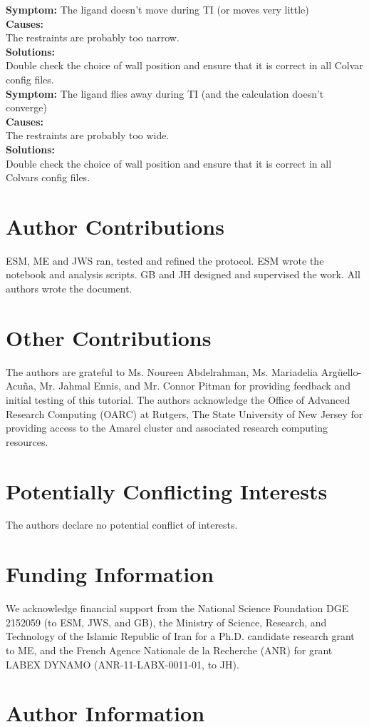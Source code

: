 \documentclass[9pt,tutorial]{Styling/livecoms}
\begin{document}
\noindent\textbf{Symptom:} The ligand doesn't move during TI (or moves very little)\\
\textbf{Causes:}\\
The restraints are probably too narrow.\\
\textbf{Solutions:}\\
Double check the choice of wall position and ensure that it is correct in all Colvar config files.\\

\noindent\textbf{Symptom:} The ligand flies away during TI (and the calculation doesn't converge)\\
\textbf{Causes:}\\
The restraints are probably too wide.\\
\textbf{Solutions:}\\
Double check the choice of wall position and ensure that it is correct in all Colvars config files.\\


\setcounter{section}{3}
\renewcommand\thesection{\arabic{section}}
\section{Author Contributions}
ESM, ME and JWS ran, tested and refined the protocol.
ESM wrote the notebook and analysis scripts.
GB and JH designed and supervised the work.
All authors wrote the document.

\section{Other Contributions}
The authors are grateful to 
Ms. Noureen Abdelrahman, 
Ms. Mariadelia Arg\"uello-Acu\~na,
Mr. Jahmal Ennis, 
and
Mr. Connor Pitman for providing feedback and initial testing of this tutorial. The authors acknowledge the Office of Advanced Research Computing (OARC) at Rutgers, The State University of New Jersey for providing access to the Amarel cluster and associated research computing resources. 

\section{Potentially Conflicting Interests}
The authors declare no potential conflict of interests.


\section{Funding Information}
We acknowledge financial support from the National Science Foundation DGE 2152059 (to ESM, JWS, and GB), the Ministry of Science, Research, and Technology of the Islamic Republic of Iran for a Ph.D. candidate research grant to ME, and the French Agence Nationale de la Recherche (ANR) for grant LABEX DYNAMO (ANR-11-LABX-0011-01, to JH).

\section*{Author Information}
\makeorcid

% 

\end{document}
